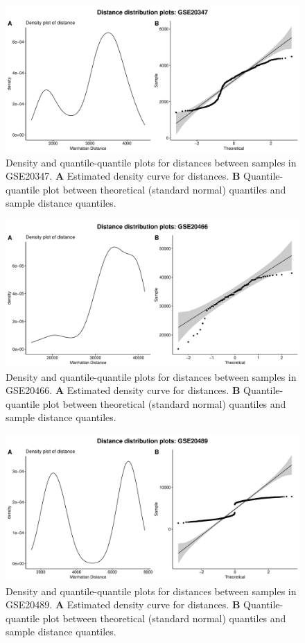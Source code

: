 \documentclass[10pt,letterpaper]{article}\usepackage[]{graphicx}\usepackage[]{color}
\begin{document}
\begin{figure}[H]
	\includegraphics[width=\textwidth]{manhattan-distance_hist_GSE20347.pdf}
	\caption{Density and quantile-quantile plots for distances between samples in GSE20347. \textbf{A} Estimated density curve for distances. \textbf{B} Quantile-quantile plot between theoretical (standard normal) quantiles and sample distance quantiles.}
\end{figure}

\begin{figure}[H]
	\includegraphics[width=\textwidth]{manhattan-distance_hist_GSE20466.pdf}
	\caption{Density and quantile-quantile plots for distances between samples in GSE20466. \textbf{A} Estimated density curve for distances. \textbf{B} Quantile-quantile plot between theoretical (standard normal) quantiles and sample distance quantiles.}
\end{figure}

\begin{figure}[H]
	\includegraphics[width=\textwidth]{manhattan-distance_hist_GSE20489.pdf}
	\caption{Density and quantile-quantile plots for distances between samples in GSE20489. \textbf{A} Estimated density curve for distances. \textbf{B} Quantile-quantile plot between theoretical (standard normal) quantiles and sample distance quantiles.}
\end{figure}
\end{document}
